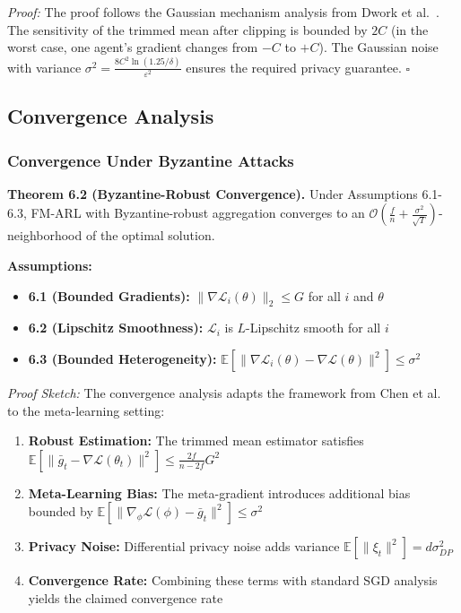 \documentclass[conference]{IEEEtran}
\newcommand{\bigO}{\mathcal{O}}
\newcommand{\epsilon}{\varepsilon}
\begin{document}
\textit{Proof:} The proof follows the Gaussian mechanism analysis from Dwork et al.~\cite{dwork2006calibrating}. The sensitivity of the trimmed mean after clipping is bounded by $2C$ (in the worst case, one agent's gradient changes from $-C$ to $+C$). The Gaussian noise with variance $\sigma^2 = \frac{8C^2\ln(1.25/\delta)}{\epsilon^2}$ ensures the required privacy guarantee. $\square$

\subsection{Convergence Analysis}

\subsubsection{Convergence Under Byzantine Attacks}

\textbf{Theorem 6.2 (Byzantine-Robust Convergence).} Under Assumptions 6.1-6.3, FM-ARL with Byzantine-robust aggregation converges to an $\bigO(\frac{f}{n} + \frac{\sigma^2}{\sqrt{T}})$-neighborhood of the optimal solution.

\textbf{Assumptions:}
\begin{itemize}
    \item \textbf{6.1 (Bounded Gradients):} $\|\nabla \mathcal{L}_i(\theta)\|_2 \leq G$ for all $i$ and $\theta$
    \item \textbf{6.2 (Lipschitz Smoothness):} $\mathcal{L}_i$ is $L$-Lipschitz smooth for all $i$
    \item \textbf{6.3 (Bounded Heterogeneity):} $\mathbb{E}[\|\nabla \mathcal{L}_i(\theta) - \nabla \mathcal{L}(\theta)\|^2] \leq \sigma^2$
\end{itemize}

\textit{Proof Sketch:} The convergence analysis adapts the framework from Chen et al.~\cite{chen2017distributed} to the meta-learning setting:

\begin{enumerate}
    \item \textbf{Robust Estimation:} The trimmed mean estimator satisfies $\mathbb{E}[\|\bar{g}_t - \nabla \mathcal{L}(\theta_t)\|^2] \leq \frac{2f}{n-2f} G^2$
    
    \item \textbf{Meta-Learning Bias:} The meta-gradient introduces additional bias bounded by $\mathbb{E}[\|\nabla_\phi \mathcal{L}(\phi) - \bar{g}_t\|^2] \leq \sigma^2$
    
    \item \textbf{Privacy Noise:} Differential privacy noise adds variance $\mathbb{E}[\|\xi_t\|^2] = d\sigma_{DP}^2$
    
    \item \textbf{Convergence Rate:} Combining these terms with standard SGD analysis yields the claimed convergence rate
\end{enumerate}
\end{document}

